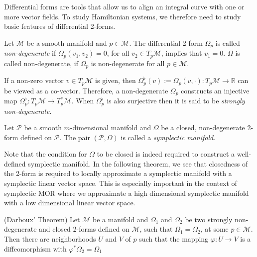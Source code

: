 Differential forms are tools that allow us to align an integral curve with one or more vector fields. To study Hamiltonian systems, we therefore need to study basic features of differential 2-forms.

\begin{definition}
	Let $\mathcal M$ be a smooth manifold and $p\in \mathcal M$. The differential 2-form $\Omega_p$ is called \emph{non-degenerate} if $\Omega_p(v_1,v_2)=0$, for all $v_2\in T_p \mathcal M$, implies that $v_1 = 0$. $\Omega$ is called non-degenerate, if $\Omega_p$ is non-degenerate for all $p\in \mathcal M$.
\end{definition}
If a non-zero vector $v\in T_p \mathcal M$ is given, then $\Omega_p^{\flat}(v):=\Omega_p(v,\cdot):T_p \mathcal M \to \mathbb R$ can be viewed as a co-vector. Therefore, a non-degenerate $\Omega_p$ constructs an injective map $\Omega_p^{\flat}:T_p\mathcal M \to T_p^* \mathcal M$. When $\Omega_p^{\flat}$ is also surjective then it is said to be \emph{strongly non-degenerate}. 

\begin{definition}
	Let $\mathcal P$ be a smooth $m$-dimensional manifold and $\Omega$ be a closed, non-degenerate 2-form defined on $\mathcal P$. The pair $(\mathcal P,\Omega)$ is called a \emph{symplectic manifold}.
\end{definition}
Note that the condition for $\Omega$ to be closed is indeed required to construct a well-defined symplectic manifold. In the following theorem, we see that closedness of the 2-form is required to locally approximate a symplectic manifold with a symplectic linear vector space. This is especially important in the context of symplectic MOR where we approximate a high dimensional symplectic manifold with a low dimensional linear vector space.

\begin{theorem} \label{theorem:2.5}
(Darboux' Theorem) Let $\mathcal M$ be a manifold and $\Omega_1$ and $\Omega_2$ be two strongly non-degenerate and closed 2-forms defined on $\mathcal M$, such that $\Omega_1 = \Omega_2$, at some $p\in \mathcal M$. Then there are neighborhoods $U$ and $V$ of $p$ such that the mapping $\varphi:U\to V$ is a diffeomorphism with $\varphi^* \Omega_2 = \Omega_1$
\end{theorem}

